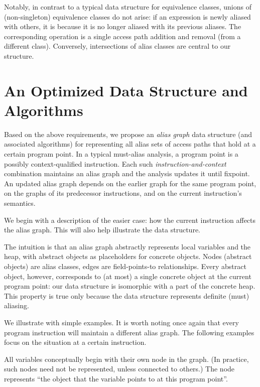 Notably, in contrast to a typical data structure for equivalence classes, unions of (non-singleton) equivalence classes do not arise: if an expression is newly aliased with others, it is because it is no longer aliased with its previous aliases. The corresponding operation is a single access path addition and removal (from a different class). Conversely, intersections of alias classes are central to our structure.


\section{An Optimized Data Structure and Algorithms}

Based on the above requirements, we propose an \emph{alias graph} data structure (and associated algorithms) for representing all alias sets of access paths that hold at a certain program point. In a typical must-alias analysis, a program point is a possibly context-qualified instruction. Each such \emph{instruction-and-context} combination maintains an alias graph and the analysis updates it until fixpoint. An updated alias graph depends on the earlier graph for the same program point, on the graphs of its predecessor instructions, and on the current instruction's semantics.

We begin with a description of the easier case: how the current instruction affects the alias graph. This will also help illustrate the data structure.

The intuition is that an alias graph abstractly represents local variables and the heap, with abstract objects as placeholders for concrete objects. Nodes (abstract objects) are alias classes, edges are field-points-to relationships. Every abstract object, however, corresponds to (at most) a single concrete object at the current program point: our data structure is isomorphic with a part of the concrete heap. This property is true only because the data structure represents definite (must) aliasing.

We illustrate with simple examples. It is worth noting once again that every program instruction will maintain a different alias graph. The following examples focus on the situation at a certain instruction.

All variables conceptually begin with their own node in the graph. (In practice, such nodes need not be represented, unless connected to others.) The node represents ``the object that the variable points to at this program point''.

